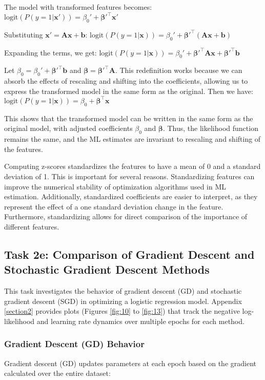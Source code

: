 \documentclass[a4paper,oneside,bibliography=totoc]{scrartcl}
\begin{document}
The model with transformed features becomes: $
\text{logit}(P(y=1|\mathbf{x}')) = \beta_0' + \mathbf{\beta}'^\top \mathbf{x}'
$

Substituting \( \mathbf{x}' = \mathbf{A} \mathbf{x} + \mathbf{b} \): $\text{logit}(P(y=1|\mathbf{x})) = \beta_0' + \mathbf{\beta}'^\top (\mathbf{A} \mathbf{x} + \mathbf{b})$

Expanding the terms, we get: $
\text{logit}(P(y=1|\mathbf{x})) = \beta_0' + \mathbf{\beta}'^\top \mathbf{A} \mathbf{x} + \mathbf{\beta}'^\top \mathbf{b}
$

Let \( \beta_0 = \beta_0' + \mathbf{\beta}'^\top \mathbf{b} \) and \( \mathbf{\beta} = \mathbf{\beta}'^\top \mathbf{A} \). This redefinition works because we can absorb the effects of rescaling and shifting into the coefficients, allowing us to express the transformed model in the same form as the original. Then we have: $\text{logit}(P(y=1|\mathbf{x})) = \beta_0 + \mathbf{\beta}^\top \mathbf{x}$ 

This shows that the transformed model can be written in the same form as the original model, with adjusted coefficients \( \beta_0 \) and \( \mathbf{\beta} \). Thus, the likelihood function remains the same, and the ML estimates are invariant to rescaling and shifting of the features.

Computing z-scores standardizes the features to have a mean of 0 and a standard deviation of 1. This is important for several reasons. Standardizing features can improve the numerical stability of optimization algorithms used in ML estimation. Additionally, standardized coefficients are easier to interpret, as they represent the effect of a one standard deviation change in the feature. Furthermore, standardizing allows for direct comparison of the importance of different features.



\subsection{Task 2e: Comparison of Gradient Descent and Stochastic Gradient Descent Methods}

This task investigates the behavior of gradient descent (GD) and stochastic gradient descent (SGD) in optimizing a logistic regression model. Appendix \ref{section2} provides plots (Figures \ref{fig:10} to \ref{fig:13}) that track the negative log-likelihood and learning rate dynamics over multiple epochs for each method.

\subsubsection{Gradient Descent (GD) Behavior}
Gradient descent (GD) updates parameters at each epoch based on the gradient calculated over the entire dataset:
\end{document}
